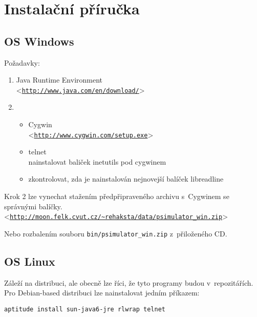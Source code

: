 \documentclass[11pt,twoside,a4paper]{book}
\let\oldUrl\url
\renewcommand\url[1]{<\texttt{\oldUrl{#1}}>}
\begin{document}
\section{Instalační příručka}

\subsection{OS Windows}
Požadavky:
\begin{enumerate}
 \item Java Runtime Environment\\
      \url{http://www.java.com/en/download/} 

 \item
       \begin{itemize}
        \item Cygwin\\
    \url{http://www.cygwin.com/setup.exe}
  \item telnet\\
    nainstalovat baliček inetutils pod cygwinem
  \item zkontrolovat, zda je nainstalován nejnovejší balíček libreadline
       \end{itemize}


\end{enumerate}



\noindent
Krok 2 lze vynechat stažením předpřipraveného archivu s~Cygwinem se správnými balíčky.\\
\url{http://moon.felk.cvut.cz/~rehaksta/data/psimulator_win.zip}

\noindent
Nebo rozbalením souboru \verb|bin/psimulator_win.zip| z~přiloženého CD.


\subsection{OS Linux}
Záleží na distribuci, ale obecně lze říci, že tyto programy budou v~repozitářích.
Pro Debian-based distribuci lze nainstalovat jedním příkazem:
\begin{verbatim}
aptitude install sun-java6-jre rlwrap telnet
\end{verbatim} 
\end{document}
